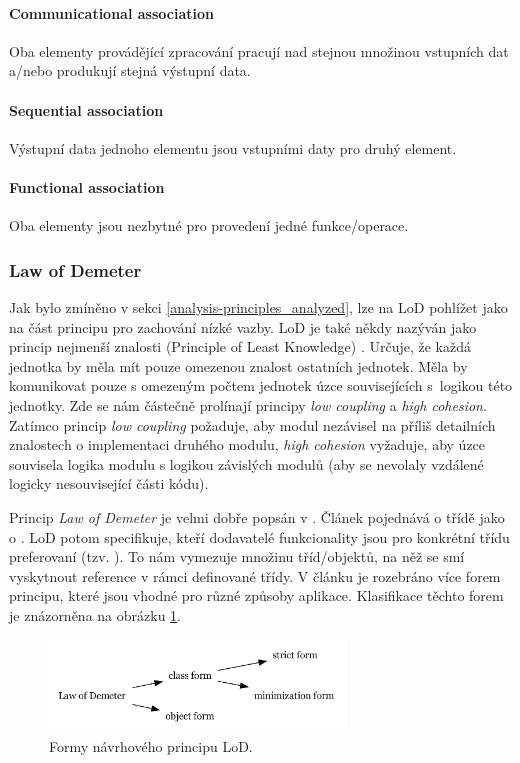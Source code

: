 \paragraph{Communicational association} Oba elementy provádějící zpracování pracují nad stejnou množinou vstupních dat a/nebo produkují stejná výstupní data.

\paragraph{Sequential association} Výstupní data jednoho elementu jsou vstupními daty pro druhý element.

\paragraph{Functional association} Oba elementy jsou nezbytné pro provedení jedné funkce/operace.

\subsubsection{Law of Demeter}
Jak bylo zmíněno v sekci \ref{analysis-principles_analyzed}, lze na LoD pohlížet jako na část principu pro zachování nízké vazby. LoD je také někdy nazýván jako princip nejmenší znalosti (Principle of Least Knowledge) \cite{wiki:lod}. Určuje, že každá jednotka by měla mít pouze omezenou znalost ostatních jednotek. Měla by komunikovat pouze s omezeným počtem jednotek úzce souvisejících s~logikou této jednotky. Zde se nám částečně prolínají principy \emph{low coupling} a \emph{high cohesion}. Zatímco princip \emph{low coupling} požaduje, aby modul nezávisel na příliš detailních znalostech o implementaci druhého modulu, \emph{high cohesion} vyžaduje, aby úzce souvisela logika modulu s logikou závislých modulů (aby se nevolaly vzdálené logicky nesouvisející části kódu).

Princip \emph{Law of Demeter} je velmi dobře popsán v \cite{35588}. Článek pojednává o třídě jako o . LoD potom specifikuje, kteří dodavatelé funkcionality jsou pro konkrétní třídu preferovaní (tzv. ). To nám vymezuje množinu tříd/objektů, na něž se smí vyskytnout reference v rámci definované třídy. V článku je rozebráno více forem principu, které jsou vhodné pro různé způsoby aplikace. Klasifikace těchto forem je znázorněna na obrázku \ref{demeter_law_types}.

\begin{figure}[h!]
  \centering
  \includegraphics[width=0.7\textwidth]{./graphs/demeter_law_types.png}
  \caption{Formy návrhového principu LoD.\label{demeter_law_types}}
\end{figure}

